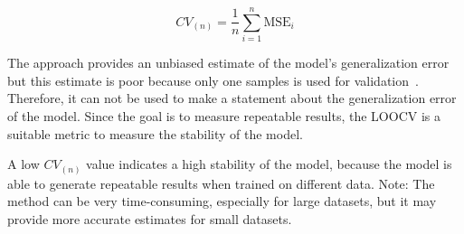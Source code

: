 \begin{tcolorbox}[arc=0pt,boxrule=0.5pt]
    \begin{equation}
        CV_{(n)} = \frac{1}{n} \sum_{i=1}^{n} \text{MSE}_{i}\label{eq:loocv}
    \end{equation}
\end{tcolorbox}

The approach provides an unbiased estimate of the model's generalization error
but this estimate is poor because only one samples is used for validation~\cite[p.
201]{gareth2013introduction}.
Therefore, it can not be used to make a statement about the generalization error of the model.
Since the goal is to measure repeatable results, the \ac{LOOCV} is a suitable metric to measure
the stability of the model.

%

A low $CV_{(n)}$ value indicates a high stability of the model, because the model is able to
generate repeatable results when trained on different data.
Note: The method can be very time-consuming, especially for large datasets, but it may provide
more accurate estimates for small datasets.




